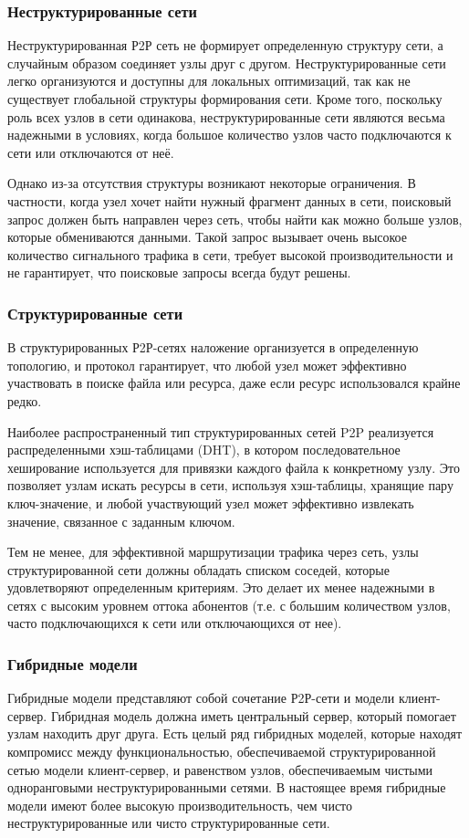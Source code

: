 \documentclass[bachelor, och, coursework]{SCWorks}
\begin{document}
\subsubsection{Неструктурированные сети}
Неструктурированная Р2Р сеть не формирует определенную структуру сети, а случайным образом соединяет узлы друг с другом. 
Неструктурированные сети легко организуются и доступны для локальных оптимизаций, так как не существует глобальной структуры формирования сети.
Кроме того, поскольку роль всех узлов в сети одинакова, неструктурированные сети являются весьма надежными в условиях, 
когда большое количество узлов часто подключаются к сети или отключаются от неё.

Однако из-за отсутствия структуры возникают некоторые ограничения. 
В частности, когда узел хочет найти нужный фрагмент данных в сети, поисковый запрос должен быть направлен через сеть, 
чтобы найти как можно больше узлов, которые обмениваются данными. Такой запрос вызывает очень высокое количество сигнального трафика в сети, 
требует высокой производительности и не гарантирует, что поисковые запросы всегда будут решены.

\subsubsection{Структурированные сети}
В структурированных Р2Р-сетях наложение организуется в определенную топологию, и протокол гарантирует, 
что любой узел может эффективно участвовать в поиске файла или ресурса, даже если ресурс использовался крайне редко.

Наиболее распространенный тип структурированных сетей P2P реализуется распределенными хэш-таблицами (DHT), 
в котором последовательное хеширование используется для привязки каждого файла к конкретному узлу. Это позволяет узлам искать ресурсы в сети, используя хэш-таблицы, хранящие пару ключ-значение, и любой участвующий узел может эффективно извлекать значение, связанное с заданным ключом.

Тем не менее, для эффективной маршрутизации трафика через сеть, узлы структурированной сети должны обладать списком соседей, которые удовлетворяют определенным критериям. 
Это делает их менее надежными в сетях с высоким уровнем оттока абонентов (т.е. с большим количеством узлов, 
часто подключающихся к сети или отключающихся от нее).

\subsubsection{Гибридные модели}
Гибридные модели представляют собой сочетание Р2Р-сети и модели клиент-сервер. 
Гибридная модель должна иметь центральный сервер, который помогает узлам находить друг друга. 
Есть целый ряд гибридных моделей, которые находят компромисс между функциональностью, обеспечиваемой структурированной сетью модели клиент-сервер, 
и равенством узлов, обеспечиваемым чистыми одноранговыми неструктурированными сетями. 
В настоящее время гибридные модели имеют более высокую производительность, чем чисто неструктурированные или чисто структурированные сети.
\end{document}
